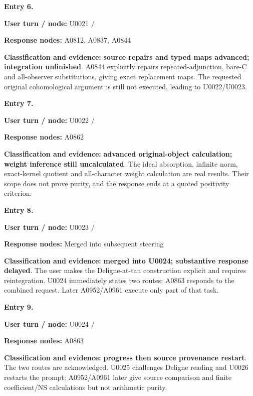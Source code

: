 \documentclass[10pt,a4paper,oneside]{report}
\begin{document}

\textbf{Entry 6.}

\textbf{User turn / node:} U0021 /
\protect{}

\textbf{Response nodes:} A0812, A0837, A0844

\textbf{Classification and evidence:} \textbf{source repairs and typed
maps advanced; integration unfinished}. A0844 explicitly repairs
repeated-adjunction, bare-C and all-observer substitutions, giving exact
replacement maps. The requested original cohomological argument is still
not executed, leading to U0022/U0023.


\textbf{Entry 7.}

\textbf{User turn / node:} U0022 /
\protect{}

\textbf{Response nodes:} A0862

\textbf{Classification and evidence:} \textbf{advanced original-object
calculation; weight inference still uncalculated}. The ideal absorption,
infinite norm, exact-kernel quotient and all-character weight
calculation are real results. Their scope does not prove purity, and the
response ends at a quoted positivity criterion.


\textbf{Entry 8.}

\textbf{User turn / node:} U0023 /
\protect{}

\textbf{Response nodes:} Merged into subsequent steering

\textbf{Classification and evidence:} \textbf{merged into U0024;
substantive response delayed}. The user makes the Deligne-at-tau
construction explicit and requires reintegration. U0024 immediately
states two routes; A0863 responds to the combined request. Later
A0952/A0961 execute only part of that task.


\textbf{Entry 9.}

\textbf{User turn / node:} U0024 /
\protect{}

\textbf{Response nodes:} A0863

\textbf{Classification and evidence:} \textbf{progress then source
provenance restart}. The two routes are acknowledged. U0025 challenges
Deligne reading and U0026 restarts the prompt; A0952/A0961 later give
source comparison and finite coefficient/NS calculations but not
arithmetic purity.
\end{document}
